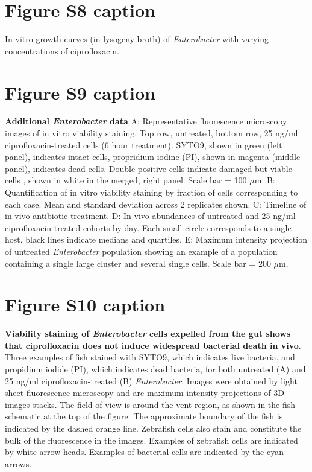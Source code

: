 \section*{Figure S8 caption}
In vitro growth curves (in lysogeny broth) of \textit{Enterobacter} with varying concentrations of ciprofloxacin.

\section*{Figure S9 caption}
\textbf{Additional \textit{Enterobacter} data}  A: Representative fluorescence microscopy images of in vitro viability staining. Top row, untreated, bottom row, 25 ng/ml ciprofloxacin-treated cells (6 hour treatment). SYTO9, shown in green (left panel), indicates intact cells, propridium iodine (PI), shown in magenta (middle panel), indicates dead cells. Double positive cells indicate damaged but viable cells \cite{ben2005genetic}, shown in white in the merged, right panel. Scale bar = 100 $\mu$m. B: Quantification of in vitro viability staining by fraction of cells corresponding to each case. Mean and standard deviation across 2 replicates shown. C: Timeline of in vivo antibiotic treatment. D: In vivo abundances of untreated and 25 ng/ml ciprofloxacin-treated cohorts by day. Each small circle corresponds to a single host, black lines indicate medians and quartiles. E: Maximum intensity projection of untreated \textit{Enterobacter} population showing an example of a population containing a single large cluster and several single cells. Scale bar = 200 $\mu$m.

\section*{Figure S10 caption}
\textbf{Viability staining of \textit{Enterobacter} cells expelled from the gut shows that ciprofloxacin does not induce widespread bacterial death in vivo}. Three examples of fish stained with SYTO9, which indicates live bacteria, and propidium iodide (PI), which indicates dead bacteria, for both untreated (A) and 25 ng/ml ciprofloxacin-treated (B) \textit{Enterobacter}. Images were obtained by light sheet fluorescence microscopy and are maximum intensity projections of 3D images stacks. The field of view is around the vent region, as shown in the fish schematic at the top of the figure. The approximate boundary of the fish is indicated by the dashed orange line. Zebrafish cells also stain and constitute the bulk of the fluorescence in the images. Examples of zebrafish cells are indicated by white arrow heads. Examples of bacterial cells are indicated by the cyan arrows.

